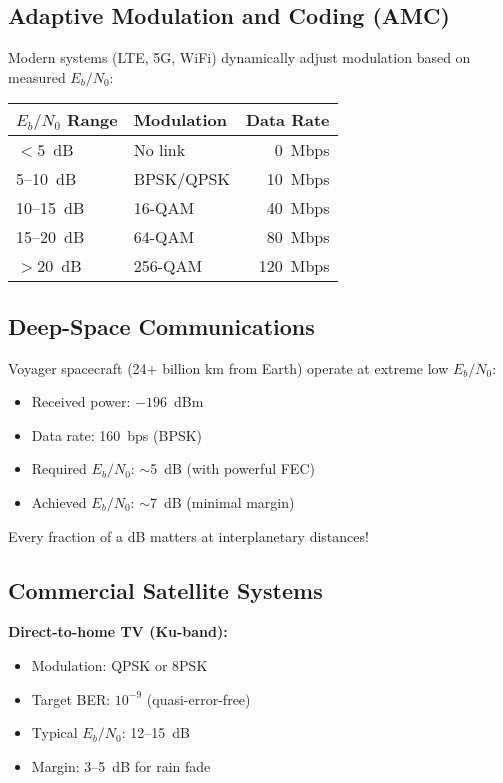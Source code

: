 \subsection{Adaptive Modulation and Coding (AMC)}

Modern systems (LTE, 5G, WiFi) dynamically adjust modulation based on measured $E_b/N_0$:

\begin{center}
\begin{tabular}{@{}llr@{}}
\toprule
$E_b/N_0$ Range & Modulation & Data Rate \\
\midrule
$< 5$~dB & No link & 0~Mbps \\
5--10~dB & BPSK/QPSK & 10~Mbps \\
10--15~dB & 16-QAM & 40~Mbps \\
15--20~dB & 64-QAM & 80~Mbps \\
$> 20$~dB & 256-QAM & 120~Mbps \\
\bottomrule
\end{tabular}
\end{center}

\subsection{Deep-Space Communications}

Voyager spacecraft (24+ billion km from Earth) operate at extreme low $E_b/N_0$:

\begin{itemize}
\item Received power: $-196$~dBm
\item Data rate: 160~bps (BPSK)
\item Required $E_b/N_0$: $\sim$5~dB (with powerful FEC)
\item Achieved $E_b/N_0$: $\sim$7~dB (minimal margin)
\end{itemize}

Every fraction of a dB matters at interplanetary distances!

\subsection{Commercial Satellite Systems}

\textbf{Direct-to-home TV (Ku-band):}
\begin{itemize}
\item Modulation: QPSK or 8PSK
\item Target BER: $10^{-9}$ (quasi-error-free)
\item Typical $E_b/N_0$: 12--15~dB
\item Margin: 3--5~dB for rain fade
\end{itemize}

